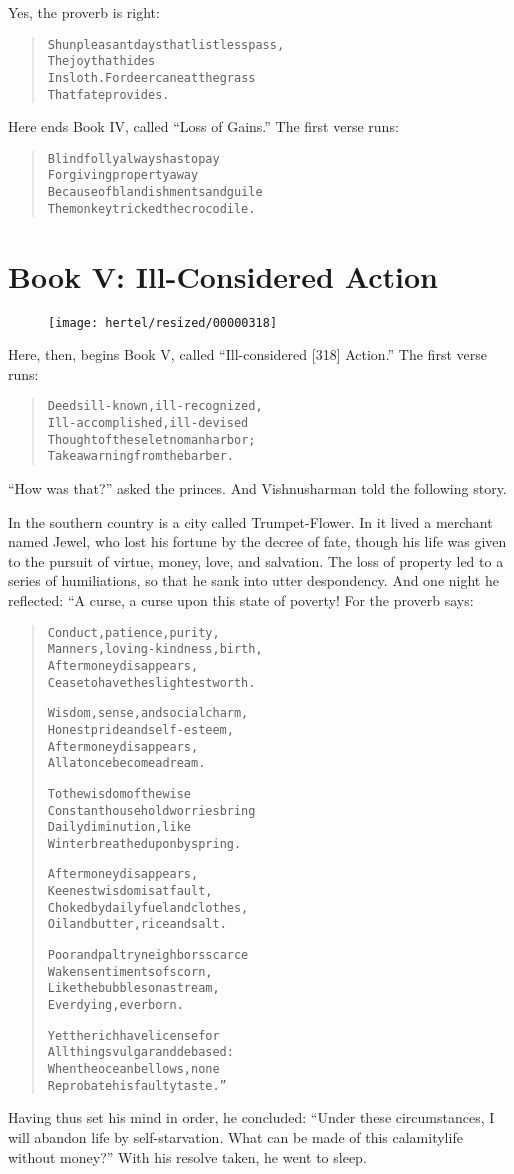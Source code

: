 \documentclass[article, twoside, 10pt]{memoir}
\renewenvironment{verbatim}{%
\begin{quote}%
\vskip -10pt%
\begin{alltt}\normalfont\small}{\end{alltt}%
\end{quote}%
\vskip -10pt
} %
\begin{document}
Yes, the proverb is right:

\begin{verbatim}
Shun pleasant days that listless pass,
    The joy that hides
In sloth. For deer can eat the grass
    That fate provides.
\end{verbatim}
Here ends Book IV, called ``Loss of Gains.'' The first verse runs:

\begin{verbatim}
Blind folly always has to pay
For giving property away
Because of blandishments and guile{\textemdash}
The monkey tricked the crocodile.
\end{verbatim}
\part{Book V: Ill-Considered Action}

\begin{figure}[p]\texttt{[image: hertel/resized/00000318]}\end{figure}Here, then, begins Book V, called ``Ill-considered [318] Action.''
The first verse runs:

\begin{verbatim}
Deeds ill-known, ill-recognized,
Ill-accomplished, ill-devised{\textemdash}
Thought of these let no man harbor;
Take a warning from the barber.
\end{verbatim}
``How was that?'' asked the princes. And Vishnusharman told the
following story.

In the southern country is a city called Trumpet-Flower. In it
lived a merchant named Jewel, who lost his fortune by the decree of
fate, though his life was given to the pursuit of virtue, money,
love, and salvation. The loss of property led to a series of
humiliations, so that he sank into utter despondency. And one night
he reflected: “A curse, a curse upon this state of poverty! For the
proverb says:

\begin{verbatim}
Conduct, patience, purity,
    Manners, loving-kindness, birth,
After money disappears,
    Cease to have the slightest worth.

Wisdom, sense, and social charm,
    Honest pride and self-esteem,
After money disappears,
    All at once become a dream.

To the wisdom of the wise
    Constant household worries bring
Daily diminution, like
    Winter breathed upon by spring.

After money disappears,
    Keenest wisdom is at fault,
Choked by daily fuel and clothes,
    Oil and butter, rice and salt.

Poor and paltry neighbors scarce
    Waken sentiments of scorn,
Like the bubbles on a stream,
    Ever dying, ever born.

Yet the rich have license for
    All things vulgar and debased:
When the ocean bellows, none
    Reprobate his faulty taste.”
\end{verbatim}
Having thus set his mind in order, he concluded:
``Under these circumstances, I will abandon life by self-starvation. What can be made of this calamity{\textemdash}life without money?''
With his resolve taken, he went to sleep.
\end{document}

